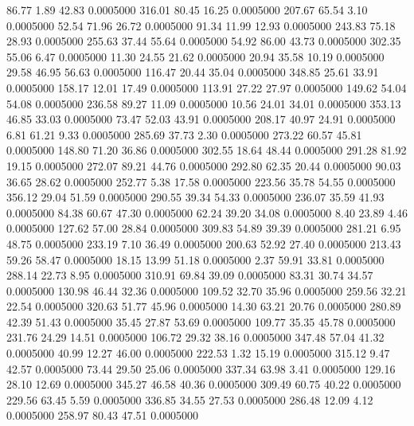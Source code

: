   86.77    1.89   42.83   0.0005000
 316.01   80.45   16.25   0.0005000
 207.67   65.54    3.10   0.0005000
  52.54   71.96   26.72   0.0005000
  91.34   11.99   12.93   0.0005000
 243.83   75.18   28.93   0.0005000
 255.63   37.44   55.64   0.0005000
  54.92   86.00   43.73   0.0005000
 302.35   55.06    6.47   0.0005000
  11.30   24.55   21.62   0.0005000
  20.94   35.58   10.19   0.0005000
  29.58   46.95   56.63   0.0005000
 116.47   20.44   35.04   0.0005000
 348.85   25.61   33.91   0.0005000
 158.17   12.01   17.49   0.0005000
 113.91   27.22   27.97   0.0005000
 149.62   54.04   54.08   0.0005000
 236.58   89.27   11.09   0.0005000
  10.56   24.01   34.01   0.0005000
 353.13   46.85   33.03   0.0005000
  73.47   52.03   43.91   0.0005000
 208.17   40.97   24.91   0.0005000
   6.81   61.21    9.33   0.0005000
 285.69   37.73    2.30   0.0005000
 273.22   60.57   45.81   0.0005000
 148.80   71.20   36.86   0.0005000
 302.55   18.64   48.44   0.0005000
 291.28   81.92   19.15   0.0005000
 272.07   89.21   44.76   0.0005000
 292.80   62.35   20.44   0.0005000
  90.03   36.65   28.62   0.0005000
 252.77    5.38   17.58   0.0005000
 223.56   35.78   54.55   0.0005000
 356.12   29.04   51.59   0.0005000
 290.55   39.34   54.33   0.0005000
 236.07   35.59   41.93   0.0005000
  84.38   60.67   47.30   0.0005000
  62.24   39.20   34.08   0.0005000
   8.40   23.89    4.46   0.0005000
 127.62   57.00   28.84   0.0005000
 309.83   54.89   39.39   0.0005000
 281.21    6.95   48.75   0.0005000
 233.19    7.10   36.49   0.0005000
 200.63   52.92   27.40   0.0005000
 213.43   59.26   58.47   0.0005000
  18.15   13.99   51.18   0.0005000
   2.37   59.91   33.81   0.0005000
 288.14   22.73    8.95   0.0005000
 310.91   69.84   39.09   0.0005000
  83.31   30.74   34.57   0.0005000
 130.98   46.44   32.36   0.0005000
 109.52   32.70   35.96   0.0005000
 259.56   32.21   22.54   0.0005000
 320.63   51.77   45.96   0.0005000
  14.30   63.21   20.76   0.0005000
 280.89   42.39   51.43   0.0005000
  35.45   27.87   53.69   0.0005000
 109.77   35.35   45.78   0.0005000
 231.76   24.29   14.51   0.0005000
 106.72   29.32   38.16   0.0005000
 347.48   57.04   41.32   0.0005000
  40.99   12.27   46.00   0.0005000
 222.53    1.32   15.19   0.0005000
 315.12    9.47   42.57   0.0005000
  73.44   29.50   25.06   0.0005000
 337.34   63.98    3.41   0.0005000
 129.16   28.10   12.69   0.0005000
 345.27   46.58   40.36   0.0005000
 309.49   60.75   40.22   0.0005000
 229.56   63.45    5.59   0.0005000
 336.85   34.55   27.53   0.0005000
 286.48   12.09    4.12   0.0005000
 258.97   80.43   47.51   0.0005000
